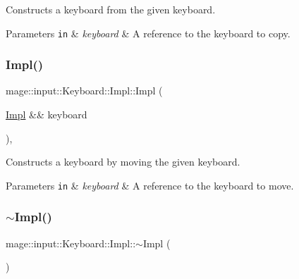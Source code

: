 Constructs a keyboard from the given keyboard.


\begin{DoxyParams}[1]{Parameters}
\mbox{\tt in}  & {\em keyboard} & A reference to the keyboard to copy. \\
\hline
\end{DoxyParams}
\mbox{\label{classmage_1_1input_1_1_keyboard_1_1_impl_a97c9edb077833236e8c2f085d5ad02cc}} 
\subsubsection{\texorpdfstring{Impl()}{Impl()}\hspace{0.1cm}{\footnotesize\ttfamily [3/3]}}
{\footnotesize\ttfamily mage\+::input\+::\+Keyboard\+::\+Impl\+::\+Impl (\begin{DoxyParamCaption}\item[{\mbox{\hyperlink{classmage_1_1input_1_1_keyboard_1_1_impl}{Impl}} \&\&}]{keyboard }\end{DoxyParamCaption})\hspace{0.3cm}{\ttfamily [default]}, {\ttfamily [noexcept]}}

Constructs a keyboard by moving the given keyboard.


\begin{DoxyParams}[1]{Parameters}
\mbox{\tt in}  & {\em keyboard} & A reference to the keyboard to move. \\
\hline
\end{DoxyParams}
\mbox{\label{classmage_1_1input_1_1_keyboard_1_1_impl_a928136f9bba9126b3cc861f05ec07675}} 
\subsubsection{\texorpdfstring{$\sim$\+Impl()}{~Impl()}}
{\footnotesize\ttfamily mage\+::input\+::\+Keyboard\+::\+Impl\+::$\sim$\+Impl (\begin{DoxyParamCaption}{ }\end{DoxyParamCaption})\hspace{0.3cm}{\ttfamily [default]}}


